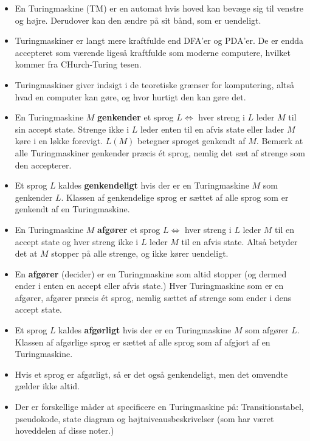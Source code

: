 \begin{itemize}
	\item En Turingmaskine (TM) er en automat hvis hoved kan bevæge sig til venstre og højre. Derudover kan den ændre på sit bånd, som er uendeligt.
	\item Turingmaskiner er langt mere kraftfulde end DFA'er og PDA'er. De er endda accepteret som værende ligeså kraftfulde som moderne computere, hvilket kommer fra CHurch-Turing tesen.
	\item Turingmaskiner giver indsigt i de teoretiske grænser for komputering, altså hvad en computer kan gøre, og hvor hurtigt den kan gøre det.
	\item En Turingmaskine $M$ \textbf{genkender} et sprog $L \iff$ hver streng i $L$ leder $M$ til sin accept state. Strenge ikke i $L$ leder enten til en afvis state eller lader $M$ køre i en løkke forevigt. $L(M)$ betegner sproget genkendt af $M$. Bemærk at alle Turingmaskiner genkender præcis ét sprog, nemlig det sæt af strenge som den accepterer.
	\item Et sprog $L$ kaldes \textbf{genkendeligt} hvis der er en Turingmaskine $M$ som genkender $L$. Klassen af genkendelige sprog er sættet af alle sprog som er genkendt af en Turingmaskine.
	\item En Turingmaskine $M$ \textbf{afgører} et sprog $L \iff$ hver streng i $L$ leder $M$ til en accept state og hver streng ikke i $L$ leder $M$ til en afvis state. Altså betyder det at $M$ stopper på alle strenge, og ikke kører uendeligt.
	\item En \textbf{afgører} (decider) er en Turingmaskine som altid stopper (og dermed ender i enten en accept eller afvis state.) Hver Turingmaskine som er en afgører, afgører præcis ét sprog, nemlig sættet af strenge som ender i dens accept state.
	\item Et sprog $L$ kaldes \textbf{afgørligt} hvis der er en Turingmaskine $M$ som afgører $L$. Klassen af afgørlige sprog er sættet af alle sprog som af afgjort af en Turingmaskine.
	\item Hvis et sprog er afgørligt, så er det også genkendeligt, men det omvendte gælder ikke altid.
	\item Der er forskellige måder at specificere en Turingmaskine på: Transitionstabel, pseudokode, state diagram og højtniveausbeskrivelser (som har været hoveddelen af disse noter.)
\end{itemize}











